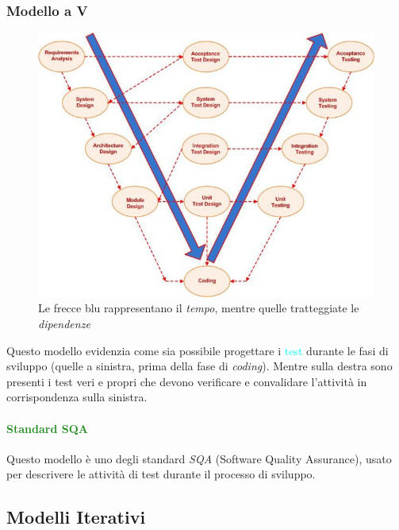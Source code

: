 \subsubsection{Modello a V}

\begin{center}
    \begin{figure}[h]
            \includegraphics[scale=0.5]{img/V-model.JPG}
        \caption{Le frecce blu rappresentano il \emph{tempo}, mentre quelle tratteggiate le \emph{dipendenze}}
    \end{figure}
\end{center}

Questo modello evidenzia come sia possibile progettare i \textcolor{cyan}{test}
durante le fasi di sviluppo (quelle a sinistra, prima della fase di \emph{coding}). Mentre sulla destra
sono presenti i test veri e propri che devono verificare e convalidare l'attività in corrispondenza sulla sinistra.

\paragraph{\textcolor{ForestGreen}{Standard SQA}}
Questo modello è uno degli standard \emph{SQA} (Software Quality Assurance), usato
per descrivere le attività di test durante il processo di sviluppo.

\subsection{Modelli Iterativi}

